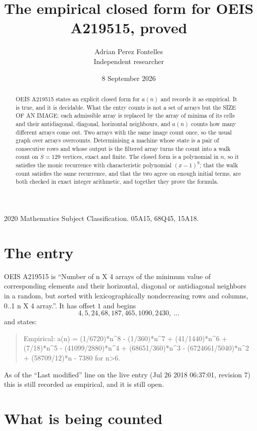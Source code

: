 \documentclass[11pt,a4paper]{article}
\title{The empirical closed form for OEIS A219515, proved}
\author{Adrian Perez Fontelles\\ \small Independent researcher}
\date{8 September 2026}
\theoremstyle{plain}
\theoremstyle{definition}
\begin{document}
\maketitle

\begin{abstract}
OEIS A219515 states an explicit closed form for $a(n)$ and records it as empirical. It is true, and
it is decidable. What the entry counts is not a set of arrays but the SIZE OF AN IMAGE: each
admissible array is replaced by the array of minima of its cells and their antidiagonal, diagonal, horizontal neighbours,
and $a(n)$ counts how many different arrays come out. Two arrays with the same image count
once, so the usual graph over arrays overcounts. Determinising a machine whose state is a pair
of consecutive rows and whose output is the filtered array turns the count into a walk count on
$S=129$ vertices, exact and finite. The closed form is a polynomial in $n$, so it satisfies the
monic recurrence with characteristic polynomial $(x-1)^{9}$; that the walk count
satisfies the same recurrence, and that the two agree on enough initial terms, are both checked
in exact integer arithmetic, and together they prove the formula.
\end{abstract}

\noindent\small 2020 Mathematics Subject Classification. 05A15, 68Q45, 15A18.\normalsize

\section{The entry}

OEIS A219515 is ``Number of n X 4 arrays of the minimum value of corresponding elements and their horizontal, diagonal or antidiagonal neighbors in a random, but sorted with lexicographically nondecreasing rows and columns, 0..1 n X 4 array.''. It has offset $1$ and begins
\[
4, 5, 24, 68, 187, 465, 1090, 2430,\ \dots
\]
and states:
\begin{quote}
Empirical: a(n) = (1/6720)*n\^{}8 - (1/360)*n\^{}7 + (41/1440)*n\^{}6 + (7/18)*n\^{}5 - (41099/2880)*n\^{}4 + (68651/360)*n\^{}3 - (6724661/5040)*n\^{}2 + (58709/12)*n - 7380 for n>6.
\end{quote}
As of the ``Last modified'' line on the live entry (Jul 26 2018 06:37:01, revision 7)
this is still recorded as empirical, and it is still open.

\section{What is being counted}
\end{document}
